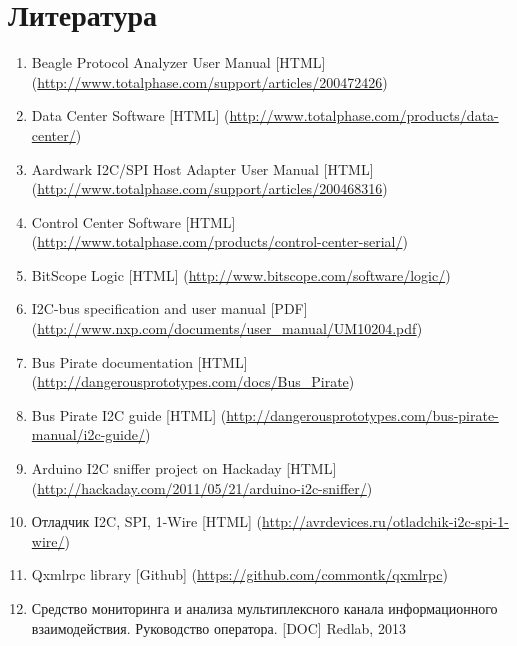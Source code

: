 \section*{Литература}

\begin{enumerate}
 \sloppy
 \item \label{beagle_protocol_analyzer} Beagle Protocol Analyzer User Manual [HTML] (\url{http://www.totalphase.com/support/articles/200472426})
 \item \label{tp_data_center} Data Center Software [HTML] (\url{http://www.totalphase.com/products/data-center/})
 \item \label{aardwark_adapter} Aardwark I2C/SPI Host Adapter User Manual [HTML] (\url{http://www.totalphase.com/support/articles/200468316})
 \item \label{tp_control_center} Control Center Software [HTML] (\url{http://www.totalphase.com/products/control-center-serial/})
 \item \label{bitscope_logic} BitScope Logic [HTML] (\url{http://www.bitscope.com/software/logic/})
 \item \label{i2c_protocol_spec} I2C-bus specification and user manual [PDF] (\url{http://www.nxp.com/documents/user_manual/UM10204.pdf})
 \item \label{buspirate_descr} Bus Pirate documentation [HTML] (\url{http://dangerousprototypes.com/docs/Bus_Pirate})
 \item \label{buspirate_i2c} Bus Pirate I2C guide [HTML] (\url{http://dangerousprototypes.com/bus-pirate-manual/i2c-guide/})
 \item \label{arduino-i2c-sniffer} Arduino I2C sniffer project on Hackaday [HTML] (\url{http://hackaday.com/2011/05/21/arduino-i2c-sniffer/})
 \item \label{i2c-spi-1w-debugger} Отладчик I2C, SPI, 1-Wire [HTML] (\url{http://avrdevices.ru/otladchik-i2c-spi-1-wire/})
 \item \label{qxmlrpc} Qxmlrpc library [Github] (\url{https://github.com/commontk/qxmlrpc})
 \item \label{sma_manual} Средство мониторинга и анализа мультиплексного канала информационного взаимодействия. Руководство оператора. [DOC] Redlab, 2013
\end{enumerate}
